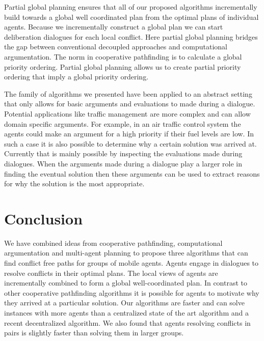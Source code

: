 Partial global planning ensures that all of our proposed algorithms 
incrementally build towards a global well coordinated plan from the optimal 
plans of individual agents. Because we incrementally construct a global plan we 
can start deliberation dialogues for each local conflict. Here partial global 
planning bridges the gap between conventional decoupled approaches and 
computational argumentation. The norm in cooperative pathfinding is to 
calculate a global priority ordering. Partial global planning allows us to 
create partial priority ordering that imply a global priority ordering.

The family of algorithms we presented have been applied to an abstract setting 
that only allows for basic arguments and evaluations to made during a 
dialogue. Potential applications like traffic management are more complex and 
can allow domain specific arguments. For example, in an air traffic control 
system the agents could make an argument for a high priority if their fuel 
levels are low.
In such a case it is also possible to determine why a certain solution was 
arrived at. Currently that is mainly possible by inspecting the evaluations 
made during dialogues. When the arguments made during a dialogue play a larger 
role in finding the eventual solution then these arguments can be used to 
extract reasons for why the solution is the most appropriate.

\section{Conclusion}
We have combined ideas from cooperative pathfinding, computational 
argumentation and multi-agent planning to propose three algorithms that can 
find conflict free paths for groups of mobile agents. Agents engage in 
dialogues to resolve conflicts in their optimal plans. The local views of 
agents are incrementally combined to form a global well-coordinated plan.
In contrast to other cooperative pathfinding algorithms it is possible for 
agents to motivate why they arrived at a particular solution.
Our algorithms are faster and can solve instances with more agents than a 
centralized state of the art algorithm and a recent decentralized algorithm.
We also found that agents resolving conflicts in pairs is slightly faster than 
solving them in larger groups.
